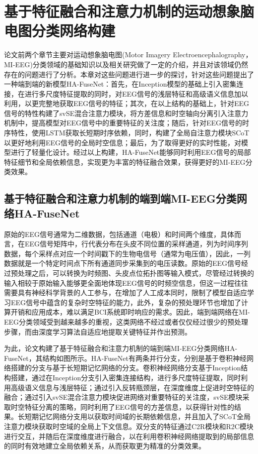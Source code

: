 
\chapter{基于特征融合和注意力机制的运动想象脑电图分类网络构建}

论文前两个章节主要对运动想象脑电图(Motor Imagery Electroencephalography，MI-EEG)分类领域的基础知识以及相关研究做了一定的介绍，并且对该领域仍然存在的问题进行了分析。本章对这些问题进行进一步的探讨，针对这些问题提出了一种端到端的新模型HA-FuseNet：首先，在Inception模型的基础上引入密集连接，在进行多尺度特征提取的同时，对EEG信号的浅层特征和高级语义信息加以利用，以更完整地获取EEG信号的特征；其次，在以上结构的基础上，针对EEG信号的特性构建了svSE混合注意力模块，将方差信息和时空轴向分离引入注意力机制中，提高模型对EEG信号中的重要特征的关注度；随后，针对EEG信号的时序特性，使用LSTM获取长短期时序依赖，同时，构建了全局自注意力模块SCoT以更好地利用EEG信号的全局时空信息；最后，为了取得更好的实时性能，对模型进行了轻量化设计。经过以上构建，HA-FuseNet能够同时利用EEG信号的局部特征细节和全局依赖信息，实现更为丰富的特征融合效果，获得更好的MI-EEG分类效果。

\section{基于特征融合和注意力机制的端到端MI-EEG分类网络HA-FuseNet}

原始的EEG信号通常为二维数据，包括通道（电极）和时间两个维度，具体而言，在EEG信号矩阵中，行代表分布在头皮不同位置的采样通道，列为时间序列数据，每个采样点对应一个时间戳下的生物电信号（通常为电压值），因此，一列数据就是一个特定时间点下所有通道同步采集到的电压读数。原始的EEG信号经过预处理之后，可以转换为时频图、头皮点位拓扑图等输入模式，尽管经过转换的输入相较于原始输入能够更全面地体现EEG信号的时频空信息，但这一过程往往需要具有神经科学背景的人工参与，在增加了人工成本同时，限制了模型自适应学习EEG信号中蕴含的复杂时空特征的能力，此外，复杂的预处理环节也增加了计算开销和应用成本，难以满足BCI系统即时响应的需求。因此，端到端网络在MI-EEG分类领域受到越来越多的重视，这类网络不经过或者仅仅经过很少的预处理步骤，而由深度学习算法自适应地提取关键特征并作出预测。

为此，论文构建了基于特征融合和注意力机制的端到端MI-EEG分类网络HA-FuseNet，其结构如图所示。HA-FuseNet有两条并行分支，分别是基于卷积神经网络搭建的分支与基于长短期记忆网络的分支。卷积神经网络分支基于Inception结构搭建，通过在Inception分支引入密集连接结构，进行多尺度特征提取，同时利用高级语义信息与浅层特征；通过引入反转瓶颈层，在深度维度上促进时空特征的融合；通过引入svSE混合注意力模块促进网络对重要特征的关注度，svSE模块采取时空特征分离的策略，同时利用了EEG信号的方差信息，以获得针对性的结果。长短期记忆网络分支用以获取时间域的长期依赖信息，并且加入了SCoT全局注意力模块获取时空域的全局上下文信息。双分支的特征通过C2R模块和R2C模块进行交互，并随后在深度维度进行融合，以在利用卷积神经网络提取到的局部信息的同时有效地建立全局依赖关系，从而获取更为精准的分类效果。

